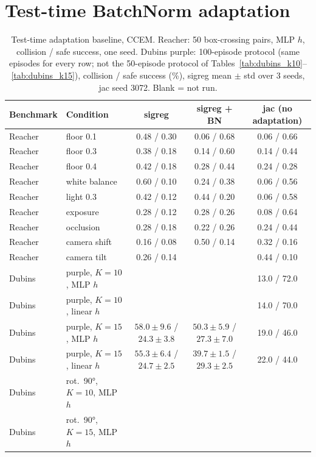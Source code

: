 \documentclass{article}
\begin{document}
\section{Test-time BatchNorm adaptation}
\label{app:bn}
\begin{table}[t]\centering\small
\caption{Test-time adaptation baseline, CCEM. Reacher: 50 box-crossing pairs, MLP $h$, collision / safe success, one seed. Dubins purple: 100-episode protocol (same episodes for every row; not the 50-episode protocol of Tables~\ref{tab:dubins_k10}--\ref{tab:dubins_k15}), collision / safe success (\%), sigreg mean $\pm$ std over 3 seeds, jac seed 3072. Blank = not run.}
\label{tab:bn_baseline}
\begin{tabular}{llccc}
\toprule
Benchmark & Condition & sigreg & sigreg + BN & jac (no adaptation) \\
\midrule
Reacher & floor 0.1 & 0.48 / 0.30 & 0.06 / 0.68 & 0.06 / 0.66 \\
Reacher & floor 0.3 & 0.38 / 0.18 & 0.14 / 0.60 & 0.14 / 0.44 \\
Reacher & floor 0.4 & 0.42 / 0.18 & 0.28 / 0.44 & 0.24 / 0.28 \\
Reacher & white balance & 0.60 / 0.10 & 0.24 / 0.38 & 0.06 / 0.56 \\
Reacher & light 0.3 & 0.42 / 0.12 & 0.44 / 0.20 & 0.06 / 0.58 \\
Reacher & exposure & 0.28 / 0.12 & 0.28 / 0.26 & 0.08 / 0.64 \\
Reacher & occlusion & 0.28 / 0.18 & 0.22 / 0.26 & 0.24 / 0.44 \\
Reacher & camera shift & 0.16 / 0.08 & 0.50 / 0.14 & 0.32 / 0.16 \\
Reacher & camera tilt & 0.26 / 0.14 &  & 0.44 / 0.10 \\
\midrule
Dubins & purple, $K=10$, MLP $h$ &  &  & 13.0 / 72.0 \\
Dubins & purple, $K=10$, linear $h$ &  &  & 14.0 / 70.0 \\
Dubins & purple, $K=15$, MLP $h$ & $58.0 \pm 9.6$ / $24.3 \pm 3.8$ & $50.3 \pm 5.9$ / $27.3 \pm 7.0$ & 19.0 / 46.0 \\
Dubins & purple, $K=15$, linear $h$ & $55.3 \pm 6.4$ / $24.7 \pm 2.5$ & $39.7 \pm 1.5$ / $29.3 \pm 2.5$ & 22.0 / 44.0 \\
Dubins & rot.\ 90°, $K=10$, MLP $h$ &  &  &  \\
Dubins & rot.\ 90°, $K=15$, MLP $h$ &  &  &  \\
\bottomrule
\end{tabular}
\end{table}
\end{document}
